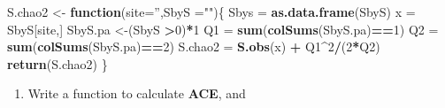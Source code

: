 \documentclass[
]{article}
\newenvironment{Shaded}{\begin{snugshade}}{\end{snugshade}}
\newcommand{\ControlFlowTok}[1]{\textcolor[rgb]{0.13,0.29,0.53}{\textbf{#1}}}
\newcommand{\DataTypeTok}[1]{\textcolor[rgb]{0.13,0.29,0.53}{#1}}
\newcommand{\DecValTok}[1]{\textcolor[rgb]{0.00,0.00,0.81}{#1}}
\newcommand{\KeywordTok}[1]{\textcolor[rgb]{0.13,0.29,0.53}{\textbf{#1}}}
\newcommand{\NormalTok}[1]{#1}
\newcommand{\OperatorTok}[1]{\textcolor[rgb]{0.81,0.36,0.00}{\textbf{#1}}}
\newcommand{\StringTok}[1]{\textcolor[rgb]{0.31,0.60,0.02}{#1}}
\providecommand{\tightlist}{%
  \setlength{\itemsep}{0pt}\setlength{\parskip}{0pt}}
\begin{document}
\begin{Shaded}
\begin{Highlighting}[]
\NormalTok{S.chao2 <-}\StringTok{ }\ControlFlowTok{function}\NormalTok{(}\DataTypeTok{site=}\StringTok{''}\NormalTok{,}\DataTypeTok{SbyS =}\StringTok{""}\NormalTok{)\{}
\NormalTok{  Sbys =}\StringTok{ }\KeywordTok{as.data.frame}\NormalTok{(SbyS)}
\NormalTok{  x =}\StringTok{ }\NormalTok{SbyS[site,]}
\NormalTok{  SbyS.pa <-(SbyS }\OperatorTok{>}\DecValTok{0}\NormalTok{)}\OperatorTok{*}\DecValTok{1}
\NormalTok{  Q1 =}\StringTok{ }\KeywordTok{sum}\NormalTok{(}\KeywordTok{colSums}\NormalTok{(SbyS.pa)}\OperatorTok{==}\DecValTok{1}\NormalTok{)}
\NormalTok{  Q2 =}\StringTok{ }\KeywordTok{sum}\NormalTok{(}\KeywordTok{colSums}\NormalTok{(SbyS.pa)}\OperatorTok{==}\DecValTok{2}\NormalTok{)}
\NormalTok{  S.chao2 =}\StringTok{ }\KeywordTok{S.obs}\NormalTok{(x) }\OperatorTok{+}\StringTok{ }\NormalTok{Q1}\OperatorTok{^}\DecValTok{2}\OperatorTok{/}\NormalTok{(}\DecValTok{2}\OperatorTok{*}\NormalTok{Q2)}
  \KeywordTok{return}\NormalTok{(S.chao2)}
\NormalTok{\}}
\end{Highlighting}
\end{Shaded}

\begin{enumerate}
\def\labelenumi{\arabic{enumi}.}
\setcounter{enumi}{2}
\tightlist
\item
  Write a function to calculate \textbf{ACE}, and
\end{enumerate}
\end{document}
